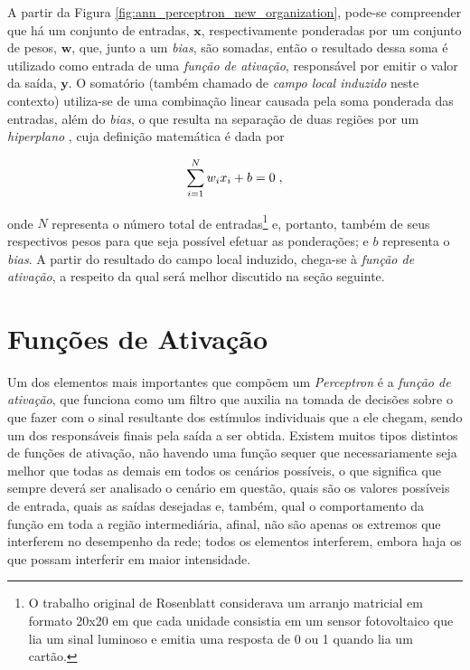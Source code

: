 A partir da Figura \ref{fig:ann_perceptron_new_organization}, pode-se compreender que há um conjunto de entradas, $\bm{x}$, respectivamente ponderadas por um conjunto de pesos, $\bm{w}$, que, junto a um \textit{bias}, são somadas, então o resultado dessa soma é utilizado como entrada de uma \textit{função de ativação}, responsável por emitir o valor da saída, $\bm{y}$. O somatório (também chamado de \textit{campo local induzido} neste contexto) utiliza-se de uma combinação linear causada pela soma ponderada das entradas, além do \textit{bias}, o que resulta na separação de duas regiões por um \textit{hiperplano} \citep{haykin1999neural}, cuja definição matemática é dada por

\begin{equation}
    \sum_{i=1}^{N} w_{i} x_{i} + b = 0
    \label{eq:ann_perceptron_hyperplane}
    \hspace{0.1cm},
    \vspace{0.2cm}
\end{equation}

\noindent onde $N$ representa o número total de entradas\footnote{O trabalho original de Rosenblatt considerava um arranjo matricial em formato 20x20 em que cada unidade consistia em um sensor fotovoltaico que lia um sinal luminoso e emitia uma resposta de 0 ou 1 quando lia um cartão.} e, portanto, também de seus respectivos pesos para que seja possível efetuar as ponderações; e $b$ representa o \textit{bias}. A partir do resultado do campo local induzido, chega-se à \textit{função de ativação}, a respeito da qual será melhor discutido na seção seguinte.

\pagebreak
\newpage

\section{Funções de Ativação}
\label{sec:ann_activation_functions}

Um dos elementos mais importantes que compõem um \textit{Perceptron} é a \textit{função de ativação}, que funciona como um filtro que auxilia na tomada de decisões sobre o que fazer com o sinal resultante dos estímulos individuais que a ele chegam, sendo um dos responsáveis finais pela saída a ser obtida. Existem muitos tipos distintos de funções de ativação, não havendo uma função sequer que necessariamente seja melhor que todas as demais em todos os cenários possíveis, o que significa que sempre deverá ser analisado o cenário em questão, quais são os valores possíveis de entrada, quais as saídas desejadas e, também, qual o comportamento da função em toda a região intermediária, afinal, não são apenas os extremos que interferem no desempenho da rede; todos os elementos interferem, embora haja os que possam interferir em maior intensidade.

